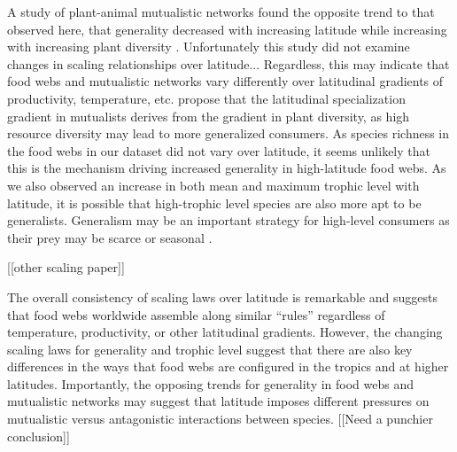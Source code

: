 A study of plant-animal mutualistic networks found the opposite trend to that observed here, that generality decreased 
with increasing latitude while increasing with increasing plant diversity \citep{Schleuning2012}. Unfortunately this 
study did not examine changes in scaling relationships over latitude... Regardless, this may indicate that food webs 
and mutualistic networks vary differently over latitudinal gradients of productivity, temperature, etc. 
\citet{Schleuning2012} propose that the latitudinal specialization gradient in mutualists derives from the gradient in 
plant diversity, as high resource diversity may lead to more generalized consumers. As species richness in the food 
webs in our dataset did not vary over latitude, it seems unlikely that this is the mechanism driving increased 
generality in high-latitude food webs. As we also observed an increase in both mean and maximum trophic level with 
latitude, it is possible that high-trophic level species are also more apt to be generalists. Generalism may be an 
important strategy for high-level consumers as their prey may be scarce or seasonal \citep{}.


[[other scaling paper]]


The overall consistency of scaling laws over latitude is remarkable and suggests that food webs worldwide assemble 
along similar ``rules'' regardless of temperature, productivity, or other latitudinal gradients. However, the changing
scaling laws for generality and trophic level suggest that there are also key differences in the ways that food webs 
are configured in the tropics and at higher latitudes. Importantly, the opposing trends for generality in food webs 
and mutualistic networks may suggest that latitude imposes different pressures on mutualistic versus antagonistic 
interactions between species. [[Need a punchier conclusion]]





